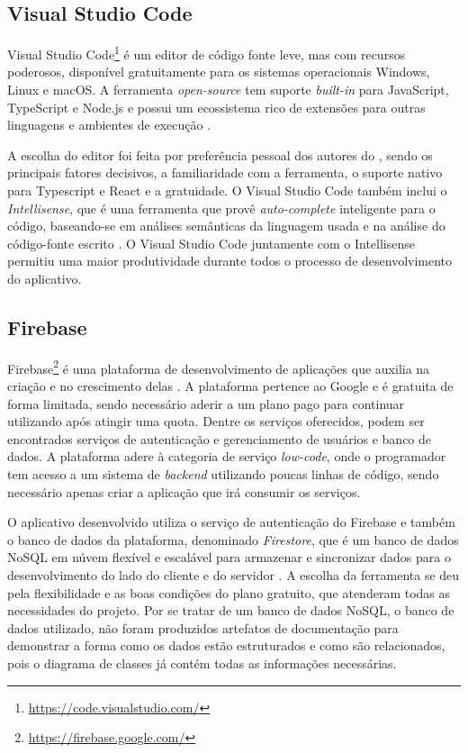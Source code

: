 \subsection{Visual Studio Code}

Visual Studio Code\footnote{\url{https://code.visualstudio.com/}} é um editor de código fonte leve, mas com recursos poderosos, disponível gratuitamente para os sistemas operacionais Windows, Linux e macOS. A ferramenta \textit{open-source} tem suporte \textit{built-in} para JavaScript, TypeScript e Node.js e possui um ecossistema rico de extensões para outras linguagens e ambientes de execução \cite{vscode}.

A escolha do editor foi feita por preferência pessoal dos autores do \appName, sendo os principais fatores decisivos, a familiaridade com a ferramenta, o suporte nativo para Typescript e React e a gratuidade. O Visual Studio Code também inclui o \textit{Intellisense}, que é uma ferramenta que provê \textit{auto-complete} inteligente para o código, baseando-se em análises semânticas da linguagem usada e na análise do código-fonte escrito \cite{intellisense}. O Visual Studio Code juntamente com o Intellisense permitiu uma maior produtividade durante todos o processo de desenvolvimento do aplicativo.

\subsection{Firebase}
\label{firebase}

Firebase\footnote{\url{https://firebase.google.com/}} é uma plataforma de desenvolvimento de aplicações que auxilia na criação e no crescimento delas \cite{firebase}. A plataforma pertence ao Google e é gratuita de forma limitada, sendo necessário aderir a um plano pago para continuar utilizando após atingir uma quota. Dentre os serviços oferecidos, podem ser encontrados serviços de autenticação e gerenciamento de usuários e banco de dados. A plataforma adere à categoria de serviço \textit{low-code}, onde o programador tem acesso a um sistema de \textit{backend} utilizando poucas linhas de código, sendo necessário apenas criar a aplicação que irá consumir os serviços.

O aplicativo desenvolvido utiliza o serviço de autenticação do Firebase e também o banco de dados da plataforma, denominado \textit{Firestore}, que é um banco de dados NoSQL em núvem flexível e escalável para armazenar e sincronizar dados para o desenvolvimento do lado do cliente e do servidor \cite{firestore}. A escolha da ferramenta se deu pela flexibilidade e as boas condições do plano gratuito, que atenderam todas as necessidades do projeto. Por se tratar de um banco de dados NoSQL, o banco de dados utilizado, não foram produzidos artefatos de documentação para demonstrar a forma como os dados estão estruturados e como são relacionados, pois o diagrama de classes já contém todas as informações necessárias. 
